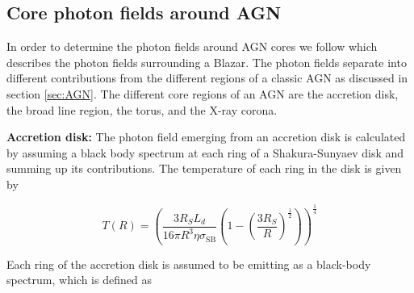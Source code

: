 
\subsection{Core photon fields around AGN}
\label{sec:photon_fields}

In order to determine the photon fields around AGN cores we follow \cite{Ghisellini_2009} which describes the photon fields surrounding a Blazar. The photon fields separate into different contributions from the different regions of a classic AGN as discussed in section \ref{sec:AGN}. 
The different core regions of an AGN are the accretion disk, the broad line region, the torus, and the X-ray corona. 

\textbf{Accretion disk:} The photon field emerging from an accretion disk is calculated by assuming a black body spectrum at each ring of a Shakura-Sunyaev disk and summing up its contributions. The temperature of 
each ring in the disk is given by 

\begin{equation}
    T(R) = \left(\frac{3 R_{S} L_{d}}{16 \pi R^3 \eta \sigma_{\mathrm{SB}}} \left(1-\left(\frac{3 R_{S}}{R}\right)^{\frac{1}{2}}\right) \right)^{\frac{1}{4}}
\end{equation}

Each ring of the accretion disk is assumed to be emitting as a black-body spectrum, which is defined as


